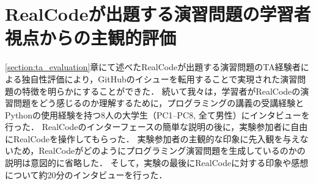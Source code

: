 \chapter{RealCodeが出題する演習問題の学習者視点からの主観的評価}
\graphicspath{{Chapter6/Figs/}}

\label{section:interview-study}

\ref{section:ta_evaluation}章にて述べたRealCodeが出題する演習問題のTA経験者による独自性評価により，GitHubのイシューを転用することで実現された演習問題の特徴を明らかにすることができた．
続いて我々は，学習者がRealCodeの演習問題をどう感じるのか理解するために，プログラミングの講義の受講経験とPythonの使用経験を持つ8人の大学生（PC1--PC8, 全て男性）にインタビューを行った．
RealCodeのインターフェースの簡単な説明の後に，実験参加者に自由にRealCodeを操作してもらった．
実験参加者の主観的な印象に先入観を与えないため，RealCodeがどのようにプログラミング演習問題を生成しているのかの説明は意図的に省略した．
そして，実験の最後にRealCodeに対する印象や感想について約20分のインタビューを行った．





